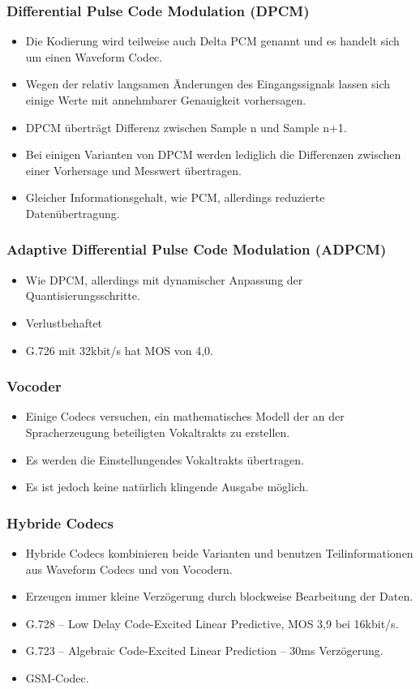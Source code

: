 \documentclass{article} %
\begin{document}
\subsubsection{Differential Pulse Code Modulation (DPCM)}
\begin{itemize}
	\item Die Kodierung wird teilweise auch Delta PCM genannt und es handelt sich um einen Waveform Codec.
	\item Wegen der relativ langsamen Änderungen des Eingangssignals lassen sich einige Werte mit annehmbarer Genauigkeit	vorhersagen.
	\item DPCM überträgt Differenz zwischen Sample n und Sample n+1.
	\item Bei einigen Varianten von DPCM werden lediglich die Differenzen zwischen einer Vorhersage und Messwert übertragen.
	\item Gleicher Informationsgehalt, wie PCM, allerdings reduzierte Datenübertragung.
\end{itemize}
\subsubsection{Adaptive Differential Pulse Code Modulation (ADPCM)}
\begin{itemize}
	\item Wie DPCM, allerdings mit dynamischer Anpassung der Quantisierungsschritte.
	\item Verlustbehaftet
	\item G.726 mit 32kbit/s hat MOS von 4,0.
\end{itemize}
\subsubsection{Vocoder}
\begin{itemize}
	\item Einige Codecs versuchen, ein mathematisches Modell der an der Spracherzeugung beteiligten Vokaltrakts zu erstellen.
	\item Es werden die \glqq Einstellungen\grqq des Vokaltrakts übertragen.
	\item Es ist jedoch keine natürlich klingende Ausgabe möglich.
\end{itemize}
\subsubsection{Hybride Codecs}
\begin{itemize}
	\item Hybride Codecs kombinieren beide Varianten und benutzen Teilinformationen aus Waveform Codecs und von Vocodern.
	\item Erzeugen immer kleine Verzögerung durch blockweise Bearbeitung der Daten.
	\item G.728 – Low Delay Code-Excited Linear Predictive, MOS 3,9	bei 16kbit/s.
	\item G.723 – Algebraic Code-Excited Linear Prediction – 30ms Verzögerung.
	\item GSM-Codec.
\end{itemize}
\end{document}

